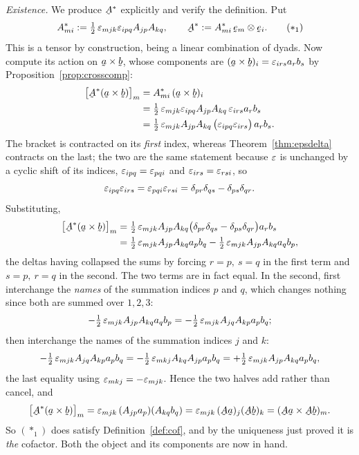 \begin{solution}
\emph{Existence.} We produce $\bA^{*}$ explicitly and verify the definition.
Put
\begin{equation}
   A^{*}_{mi}:=\tfrac12\,\eps_{mjk}\eps_{ipq}A_{jp}A_{kq},
   \qquad \bA^{*}:=A^{*}_{mi}\,\be_{m}\otimes\be_{i}. \tag{$\ast_1$}
\end{equation}
This is a tensor by construction, being a linear combination of dyads. Now
compute its action on $\ba\times\bb$, whose components are
$(\ba\times\bb)_{i}=\eps_{irs}a_{r}b_{s}$ by
Proposition~\ref{prop:crosscomp}:
\[
\begin{aligned}
   \big[\bA^{*}(\ba\times\bb)\big]_{m}
   &=A^{*}_{mi}\,(\ba\times\bb)_{i}\\
   &=\tfrac12\,\eps_{mjk}\eps_{ipq}A_{jp}A_{kq}\,\eps_{irs}a_{r}b_{s}\\
   &=\tfrac12\,\eps_{mjk}A_{jp}A_{kq}\,
     \big(\eps_{ipq}\eps_{irs}\big)\,a_{r}b_{s}.
\end{aligned}
\]
The bracket is contracted on its \emph{first} index, whereas
Theorem~\ref{thm:epsdelta} contracts on the last; the two are the same
statement because $\varepsilon$ is unchanged by a cyclic shift of its indices,
$\varepsilon_{ipq}=\varepsilon_{pqi}$ and $\varepsilon_{irs}=\varepsilon_{rsi}$, so
\[
   \varepsilon_{ipq}\varepsilon_{irs}=\varepsilon_{pqi}\varepsilon_{rsi}
   =\delta_{pr}\delta_{qs}-\delta_{ps}\delta_{qr}.
\]
Substituting,
\[
\begin{aligned}
   \big[\bA^{*}(\ba\times\bb)\big]_{m}
   &=\tfrac12\,\eps_{mjk}A_{jp}A_{kq}
     \big(\dd_{pr}\dd_{qs}-\dd_{ps}\dd_{qr}\big)a_{r}b_{s}\\
   &=\tfrac12\,\eps_{mjk}A_{jp}A_{kq}a_{p}b_{q}
    -\tfrac12\,\eps_{mjk}A_{jp}A_{kq}a_{q}b_{p},
\end{aligned}
\]
the deltas having collapsed the sums by forcing $r=p,\ s=q$ in the first
term and $s=p,\ r=q$ in the second. The two terms are in fact equal. In the
second, first interchange the \emph{names} of the summation indices $p$ and
$q$, which changes nothing since both are summed over $1,2,3$:
\[
   -\tfrac12\,\varepsilon_{mjk}A_{jp}A_{kq}a_{q}b_{p}
   =-\tfrac12\,\varepsilon_{mjk}A_{jq}A_{kp}a_{p}b_{q};
\]
then interchange the names of the summation indices $j$ and $k$:
\[
   -\tfrac12\,\varepsilon_{mjk}A_{jq}A_{kp}a_{p}b_{q}
   =-\tfrac12\,\varepsilon_{mkj}A_{kq}A_{jp}a_{p}b_{q}
   =+\tfrac12\,\varepsilon_{mjk}A_{jp}A_{kq}a_{p}b_{q},
\]
the last equality using $\varepsilon_{mkj}=-\varepsilon_{mjk}$. Hence the two halves add
rather than cancel, and
\[
   \big[\bA^{*}(\ba\times\bb)\big]_{m}
   =\eps_{mjk}\,(A_{jp}a_{p})(A_{kq}b_{q})
   =\eps_{mjk}\,(\bA\ba)_{j}(\bA\bb)_{k}
   =(\bA\ba\times\bA\bb)_{m}.
\]
So $(\ast_1)$ does satisfy Definition~\ref{def:cof}, and by the uniqueness
just proved it is \emph{the} cofactor. Both the object and its components
are now in hand.


\end{solution}
